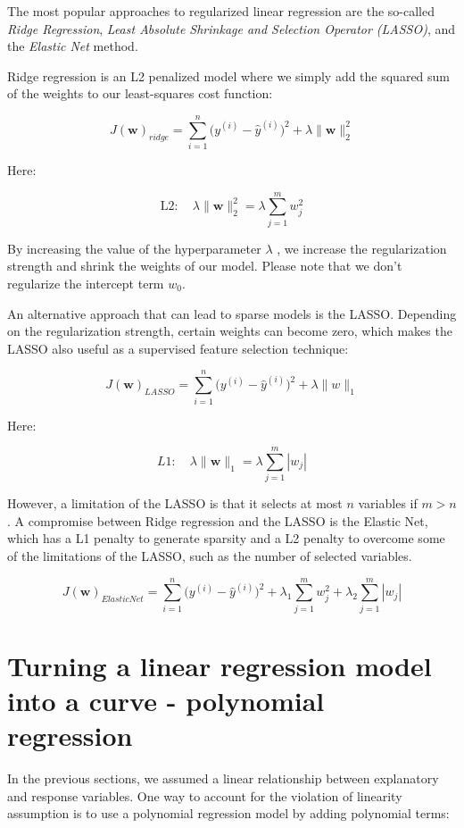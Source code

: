 \documentclass[letterpaper]{report}
\begin{document}
The most popular approaches to regularized linear regression are the so-called \textit{Ridge Regression}, \textit{Least Absolute Shrinkage and Selection Operator (LASSO)}, and the \textit{Elastic Net} method.

Ridge regression is an L2 penalized model where we simply add the squared sum of the weights to our least-squares cost function:

\[
J(\mathbf{w})_{ridge} = \sum^{n}_{i=1} \big( y^{(i)} - \hat{y}^{(i)} \big)^2 + \lambda \lVert \mathbf{w}  \rVert^{2}_{2}
\]

Here:

\[
\text{L2}: \quad \lambda \lVert \mathbf{w}  \rVert^{2}_{2} = \lambda \sum^{m}_{j=1} w_{j}^{2}
\]

By increasing the value of the hyperparameter $\lambda$ , we increase the regularization strength and shrink the weights of our model. Please note that we don't regularize the intercept term $w_0$.

An alternative approach that can lead to sparse models is the LASSO. Depending on the regularization strength, certain weights can become zero, which makes the LASSO also useful as a supervised feature selection technique:

\[
J(\mathbf{w})_{LASSO} = \sum^{n}_{i=1} \big( y^{(i)} - \hat{y}^{(i)} \big)^2 + \lambda \lVert w \rVert_1
\]

Here:

\[
L1: \quad \lambda \lVert \mathbf{w} \rVert_1  = \lambda \sum^{m}_{j=1} | w_j |
\]

However, a limitation of the LASSO is that it selects at most $n$ variables if $m > n$. A compromise between Ridge regression and the LASSO is the Elastic Net, which has a L1 penalty to generate sparsity and a L2 penalty to overcome some of the limitations of the LASSO, such as the number of selected variables.

\[
J(\mathbf{w})_{ElasticNet} = \sum_{i=1}^{n} \big( y^{(i)} - \hat{y}^{(i)}  \big)^2 + \lambda_1 \sum^{m}_{j=1} w_{j}^2+ \lambda_2 \sum^{m}_{j=1} |w_j|
\]

\section{Turning a linear regression model into a curve - polynomial regression}

In the previous sections, we assumed a linear relationship between explanatory and response variables. One way to account for the violation of linearity assumption is to use a polynomial regression model by adding polynomial terms:
\end{document}
